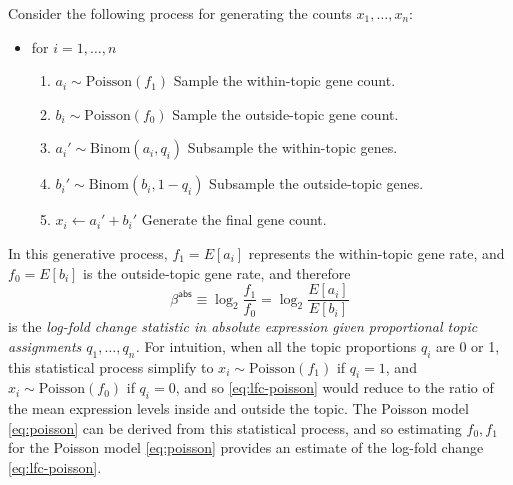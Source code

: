 \documentclass[final]{siamart171218}
\begin{document}
Consider the following process for generating the counts $x_1, \ldots,
x_n$:
\begin{itemize}

\item for $i = 1, \ldots, n$
\begin{enumerate}

\item $a_i \sim \mathrm{Poisson}(f_1)$ 
\hfill Sample the within-topic gene count. \hspace{2em}

\item $b_i \sim \mathrm{Poisson}(f_0)$ 
\hfill Sample the outside-topic gene count. \hspace{2em}

\item $a_i' \sim \mathrm{Binom}(a_i, q_i)$ 
\hfill Subsample the within-topic genes. \hspace{2em}

\item $b_i' \sim \mathrm{Binom}(b_i, 1-q_i)$ 
\hfill Subsample the outside-topic genes. \hspace{2em}

\item $x_i \leftarrow a_i' + b_i'$ 
\hfill Generate the final gene count. \hspace{2em}

\end{enumerate}
\end{itemize}
In this generative process, $f_1 = E[a_i]$ represents the
within-topic gene rate, and $f_0 = E[b_i]$ is the outside-topic gene
rate, and therefore 
\begin{equation}
\beta^{\mathsf{abs}} \equiv 
\log_2 \frac{f_1}{f_0} = \log_2 \frac{E[a_i]}{E[b_i]}
\label{eq:lfc-poisson}
\end{equation}
is the {\em log-fold change statistic in absolute expression given
  proportional topic assignments $q_1, \ldots, q_n$.} For intuition,
when all the topic proportions $q_i$ are 0 or 1, this statistical
process simplify to $x_i \sim \mathrm{Poisson}(f_1)$ if $q_i = 1$, and
$x_i \sim \mathrm{Poisson}(f_0)$ if $q_i = 0$, and so
\eqref{eq:lfc-poisson} would reduce to the ratio of the mean
expression levels inside and outside the topic. The Poisson model
\eqref{eq:poisson} can be derived from this statistical process, and
so estimating $f_0, f_1$ for the Poisson model \eqref{eq:poisson}
provides an estimate of the log-fold change \eqref{eq:lfc-poisson}.
\end{document}
